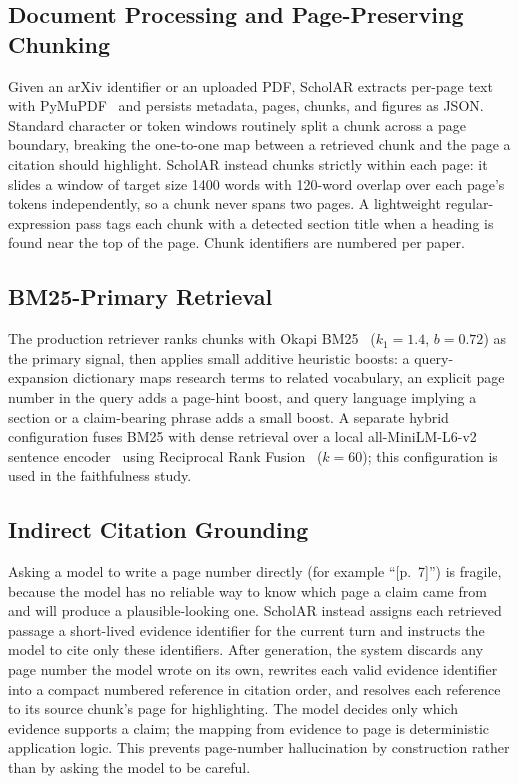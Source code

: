\documentclass[11pt,letterpaper]{article}
\begin{document}
\subsection{Document Processing and Page-Preserving Chunking}
Given an arXiv identifier or an uploaded PDF, ScholAR extracts per-page text with
PyMuPDF~\citep{pymupdf} and persists metadata, pages, chunks, and figures as JSON.
Standard character or token windows routinely split a chunk across a page boundary,
breaking the one-to-one map between a retrieved chunk and the page a citation should
highlight. ScholAR instead chunks strictly within each page: it slides a window of
target size 1400 words with 120-word overlap over each page's tokens independently,
so a chunk never spans two pages. A lightweight regular-expression pass tags each
chunk with a detected section title when a heading is found near the top of the
page. Chunk identifiers are numbered per paper.

\subsection{BM25-Primary Retrieval}
The production retriever ranks chunks with Okapi BM25~\citep{robertson2009bm25}
($k_1{=}1.4$, $b{=}0.72$) as the primary signal, then applies small additive
heuristic boosts: a query-expansion dictionary maps research terms to related
vocabulary, an explicit page number in the query adds a page-hint boost, and query
language implying a section or a claim-bearing phrase adds a small boost. A separate
hybrid configuration fuses BM25 with dense retrieval over a local
all-MiniLM-L6-v2 sentence encoder~\citep{reimers2019sbert} using Reciprocal Rank
Fusion~\citep{cormack2009rrf} ($k{=}60$); this configuration is used in the
faithfulness study.

\subsection{Indirect Citation Grounding}
Asking a model to write a page number directly (for example ``[p.~7]'') is fragile,
because the model has no reliable way to know which page a claim came from and will
produce a plausible-looking one. ScholAR instead assigns each retrieved passage a
short-lived evidence identifier for the current turn and instructs the model to cite
only these identifiers. After generation, the system discards any page number the
model wrote on its own, rewrites each valid evidence identifier into a compact
numbered reference in citation order, and resolves each reference to its source
chunk's page for highlighting. The model decides only which evidence supports a
claim; the mapping from evidence to page is deterministic application logic. This
prevents page-number hallucination by construction rather than by asking the model
to be careful.
\end{document}
